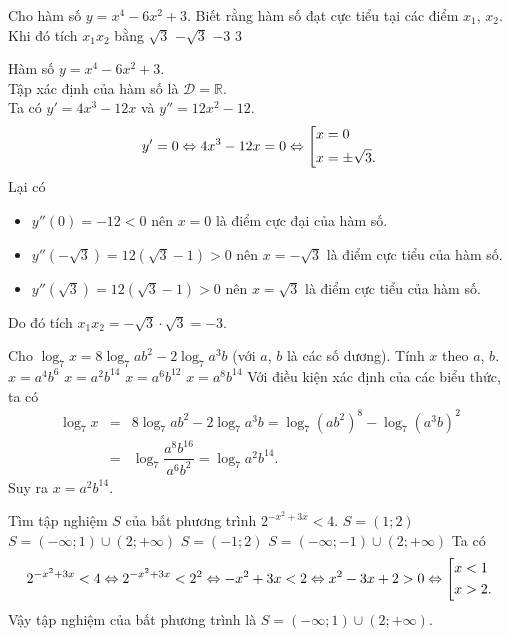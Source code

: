 \begin{ex}%
 Cho hàm số $y = x^4 - 6x^2 + 3$. Biết rằng hàm số đạt cực tiểu tại các điểm $x_1$, $x_2$. Khi đó tích $x_1x_2$ bằng
 \choice
  {$\sqrt{3}$}
  {$-\sqrt{3}$}
  {\True $-3$}
  {$3$}
 \loigiai
  {
  Hàm số $y = x^4 - 6x^2 + 3$.\\
  Tập xác định của hàm số là $\mathscr{D} = \mathbb{R}$.\\
  Ta có $y' = 4x^3 - 12x$ và $y'' = 12x^2 - 12$.
  \begin{eqnarray*}
   y' = 0 \Leftrightarrow 4x^3 - 12x = 0 \Leftrightarrow \left[\begin{aligned}& x = 0 \\& x = \pm \sqrt{3}.\end{aligned}\right.
  \end{eqnarray*}
  Lại có
  \begin{itemize}
   \item $y''(0) = -12 < 0$ nên $x = 0$ là điểm cực đại của hàm số.
   \item $y''\left(-\sqrt{3}\right) = 12 \left( \sqrt{3} - 1 \right) > 0$ nên $x = -\sqrt{3}$ là điểm cực tiểu của hàm số.
   \item $y''(\sqrt{3}) = 12 \left( \sqrt{3} - 1 \right) > 0$ nên $x = \sqrt{3}$ là điểm cực tiểu của hàm số.
  \end{itemize}
  Do đó tích $x_1x_2=-\sqrt{3} \cdot \sqrt{3} = -3$.
  }
\end{ex}

\begin{ex}%
 Cho $\log_7 x = 8\log_7 ab^2 - 2\log_7 a^3b$ (với $a$, $b$ là các số dương). Tính $x$ theo $a$, $b$.
 \choice
  {$x = a^4b^6$}
  {\True $x = a^2b^{14}$}
  {$x = a^6b^{12}$}
  {$x = a^8b^{14}$}
 \loigiai
  {
  Với điều kiện xác định của các biểu thức, ta có
  \begin{eqnarray*}
   \log_7 x &=& 8\log_7 ab^2 - 2\log_7 a^3b = \log_7 (ab^2)^8 - \log_7 (a^3b)^2 \\
   			&=& \log_7 \dfrac{a^8 b^{16}}{a^6 b^2} = \log_7 a^2 b^{14}.
  \end{eqnarray*}
  Suy ra $ x = a^2 b^{14}$.
  }
\end{ex}

\begin{ex}%
 Tìm tập nghiệm $S$ của bất phương trình $2^{-x^2 + 3x} < 4$.
 \choice
  {$S = (1;2)$}
  {\True $S = (-\infty; 1) \cup (2;+\infty)$}
  {$S = (-1;2)$}
  {$S = (-\infty;-1) \cup (2;+\infty)$}
 \loigiai
  {
  Ta có
  \begin{eqnarray*}
   2^{-x^2 + 3x} < 4 \Leftrightarrow 2^{-x^2+3x}<2^2 \Leftrightarrow -x^2 + 3x < 2 \Leftrightarrow x^2 - 3x + 2 > 0 \Leftrightarrow \left[\begin{aligned}& x < 1 \\& x > 2.\end{aligned}\right.
  \end{eqnarray*}
  Vậy tập nghiệm của bất phương trình là $S = (-\infty; 1) \cup (2;+\infty)$.
  }
\end{ex}


